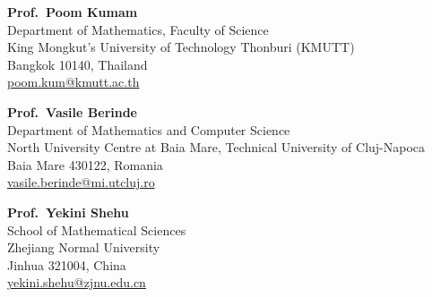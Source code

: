 \documentclass[11pt,a4paper]{article}
\newcommand{\cvsection}[1]{%
  \vspace{9pt}\pagebreak[2]%
  {\color{accent}\large\scshape #1}\par\nopagebreak
  \vspace{-3pt}{\color{accent}\rule{\linewidth}{0.8pt}}\par\nopagebreak
  \vspace{4pt}}
\begin{document}
\cvsection{Referees}
\noindent
\begin{minipage}[t]{0.32\linewidth}\small\raggedright
  \textbf{Prof.\ Poom Kumam}\\
  Department of Mathematics, Faculty of Science\\
  King Mongkut's University of Technology Thonburi (KMUTT)\\
  Bangkok 10140, Thailand\\
  \href{mailto:poom.kum@kmutt.ac.th}{poom.kum@kmutt.ac.th}
\end{minipage}\hfill
\begin{minipage}[t]{0.32\linewidth}\small\raggedright
  \textbf{Prof.\ Vasile Berinde}\\
  Department of Mathematics and Computer Science\\
  North University Centre at Baia Mare, 
  Technical University of Cluj-Napoca\\
  Baia Mare 430122, Romania\\
  \href{mailto:vasile.berinde@mi.utcluj.ro}{vasile.berinde@mi.utcluj.ro}
\end{minipage}\hfill
\begin{minipage}[t]{0.30\linewidth}\small\raggedright
  \textbf{Prof.\ Yekini Shehu}\\
  School of Mathematical Sciences\\
  Zhejiang Normal University\\
  Jinhua 321004, China\\
  \href{mailto:yekini.shehu@zjnu.edu.cn}{yekini.shehu@zjnu.edu.cn}
\end{minipage}
\end{document}
